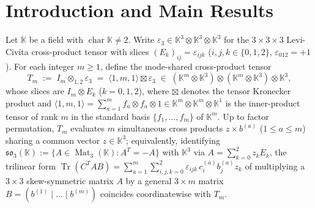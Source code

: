 \documentclass[11pt,reqno]{amsart}
\theoremstyle{definition}
\theoremstyle{remark}
\numberwithin{equation}{section}
\newcommand{\KK}{\mathbb{K}}
\DeclareMathOperator{\Mat}{Mat}
\DeclareMathOperator{\Tr}{Tr}
\DeclareMathOperator{\chr}{char}
\begin{document}
\maketitle

\section{Introduction and Main Results}\label{sec:intro}

Let $\KK$ be a field with $\chr\KK \neq 2$. Write $\varepsilon_3 \in \KK^3 \otimes \KK^3 \otimes \KK^3$ for the $3 \times 3 \times 3$ Levi-Civita cross-product tensor with slices $(E_k)_{ij} = \varepsilon_{ijk}$ ($i, j, k \in \{0, 1, 2\}$, $\varepsilon_{012} = +1$). For each integer $m \ge 1$, define the mode-shared cross-product tensor
\begin{equation}\label{eq:Tm-def}
  T_m \;:=\; I_m \otimes_{1,2} \varepsilon_3 \;=\; \langle 1, m, 1 \rangle \boxtimes \varepsilon_3 \;\in\; (\KK^m \otimes \KK^3) \otimes (\KK^m \otimes \KK^3) \otimes \KK^3,
\end{equation}
whose slices are $I_m \otimes E_k$ ($k = 0, 1, 2$), where $\boxtimes$ denotes the tensor Kronecker product and $\langle 1, m, 1 \rangle = \sum_{a=1}^m f_a \otimes f_a \otimes 1 \in \KK^m \otimes \KK^m \otimes \KK^1$ is the inner-product tensor of rank $m$ in the standard basis $\{f_1, \dots, f_m\}$ of $\KK^m$. Up to factor permutation, $T_m$ evaluates $m$ simultaneous cross products $z \times b^{(a)}$ ($1 \le a \le m$) sharing a common vector $z \in \KK^3$; equivalently, identifying $\mathfrak{so}_3(\KK) := \{A \in \Mat_3(\KK) : A^T = -A\}$ with $\KK^3$ via $A = \sum_{k=0}^2 z_k E_k$, the trilinear form $\Tr(C^T A B) = \sum_{a=1}^m \sum_{i,j,k=0}^2 \varepsilon_{ijk}\, c_i^{(a)} b_j^{(a)} z_k$ of multiplying a $3 \times 3$ skew-symmetric matrix $A$ by a general $3 \times m$ matrix $B = (b^{(1)} \mid \dots \mid b^{(m)})$ coincides coordinatewise with $T_m$.
\end{document}
